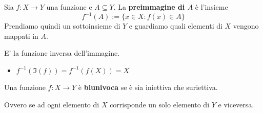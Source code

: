 \documentclass[../main.tex]{subfiles}
\begin{document}
\begin{definition}[Preimmagine]
    Sia $f: X \rightarrow Y$ una funzione e $A \subseteq Y$. La \textbf{preimmagine di $A$} è l'insieme
    \[
        f^{-1}(A) := \{ x \in X : f(x) \in A \}
    \]
    Prendiamo quindi un sottoinsieme di $Y$ e guardiamo quali elementi di $X$ vengono mappati in $A$.
    \begin{note}
        E' la funzione inversa dell'immagine.
        \begin{itemize}
            \item $f^{-1}(\Im(f)) = f^{-1}(f(X)) = X$
        \end{itemize}
    \end{note}
\end{definition}

\begin{definition}
    Una funzione $f: X \rightarrow Y$ è \textbf{biunivoca} se è sia iniettiva che suriettiva.

    Ovvero se ad ogni elemento di $X$ corrisponde un solo elemento di $Y$ e viceversa.
\end{definition}
\end{document}
